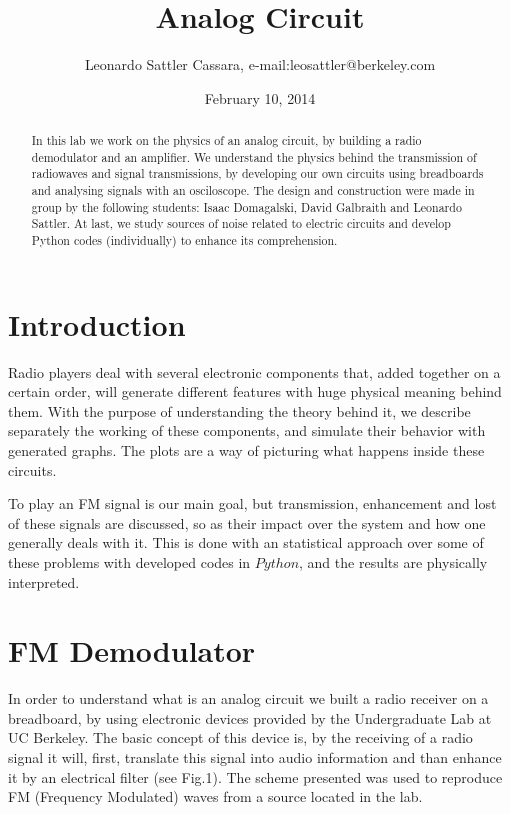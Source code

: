 \documentclass{article}
\begin{document}
\title{Analog Circuit}
\author{Leonardo Sattler Cassara, e-mail:leosattler@berkeley.com}
\date{February 10, 2014}
\maketitle

\begin{abstract}
In this lab we work on the physics of an analog circuit, by building a
radio demodulator and an amplifier. We understand the physics behind the transmission of radiowaves and signal transmissions, by developing our own circuits using breadboards and analysing signals with an osciloscope. The design and construction were made in group by the following students: Isaac Domagalski, David Galbraith and Leonardo Sattler. At last, we study sources of noise related to electric circuits and develop Python codes (individually) to enhance its comprehension. 

\end{abstract}

\section{Introduction}

Radio players deal with several electronic components that, added
together on a certain order, will generate different features with huge
physical meaning behind them. With the purpose of understanding the
theory behind it, we describe separately the working of these
components, and simulate their behavior with generated graphs. The plots
are a way of picturing what happens inside these circuits.

To play an FM signal is our main goal, but transmission, enhancement and
lost of these signals are discussed, so as their impact over the system
and how one generally deals with it. This is done with an statistical
approach over some of these problems with developed codes
in $Python$, and the results are physically interpreted.

\section{FM Demodulator} 

In order to understand what is an analog circuit we built a radio receiver on a breadboard, by using electronic devices provided by the Undergraduate Lab at UC Berkeley. The basic concept of this device is, by the receiving
of a radio signal it will, first, translate this signal into audio information and than enhance it by an electrical filter (see Fig.1). The scheme presented was used to reproduce FM (Frequency Modulated) waves from a source located in the lab. 
\end{document}
